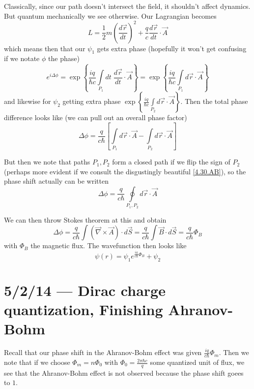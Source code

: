 \documentclass[10pt]{report}
\newcommand{\rd}[2]{\frac{d#1}{d#2}}
\begin{document}
Classically, since our path doesn't intersect the field, it shouldn't affect dynamics. But quantum mechanically we see otherwise. Our Lagrangian becomes
\begin{equation}
    L = \frac{1}{2}m\left( \rd{\vec{r}}{t} \right)^2 + \frac{q}{c}\rd{\vec{r}}{t}\cdot \vec{A}
\end{equation}
which means then that our $\psi_1$ gets extra phase (hopefully it won't get confusing if we notate $\phi$ the phase)
\begin{equation}
    e^{i\Delta \phi} = \exp\left\{ \frac{iq}{\hbar c}\int\limits_{P_1} dt\; \rd{\vec{r}}{t}\cdot \vec{A} \right\} = \exp\left\{ \frac{iq}{\hbar c} \int\limits_{P_1}^{}d\vec{r}\cdot \vec{A} \right\}
\end{equation}
and likewise for $\psi_2$ getting extra phase $\exp\left\{ \frac{iq}{\hbar c}\int\limits_{P_2}^{}d\vec{r} \cdot \vec{A} \right\}$. Then the total phase difference looks like (we can pull out an overall phase factor)
\begin{equation}
    \Delta \phi = \frac{q}{c\hbar}\left[ \int\limits_{P_1}^{}d\vec{r} \cdot \vec{A} - \int\limits_{P_2}^{}d\vec{r} \cdot \vec{A} \right]
\end{equation}

But then we note that paths $P_1, P_2$ form a closed path if we flip the sign of $P_2$ (perhaps more evident if we consult the disgustingly beautiful \ref{4.30.AB}), so the phase shift actually can be written
\begin{equation}
    \Delta \phi = \frac{q}{c\hbar} \oint\limits_{P_1, P_2} d\vec{r} \cdot \vec{A}
\end{equation}

We can then throw Stokes theorem at this and obtain
\begin{equation}
    \Delta \phi = \frac{q}{c\hbar}\int \left( \vec{\nabla} \times \vec{A} \right)\cdot d\vec{S} = \frac{q}{c\hbar}\int \vec{B} \cdot d\vec{S} = \frac{q}{c\hbar} \Phi_B
\end{equation}
with $\Phi_B$ the magnetic flux. The wavefunction then looks like
\begin{equation}
    \psi(r) = \psi_1e^{\frac{iq}{c\hbar}\Phi_B} + \psi_2
\end{equation}
\chapter{5/2/14 --- Dirac charge quantization, Finishing Ahranov-Bohm}

Recall that our phase shift in the Ahranov-Bohm effect was given $\frac{iq}{c\hbar}\Phi_m$. Then we note that if we choose $\Phi_m = n\Phi_0$ with $\Phi_0 = \frac{2\pi \hbar c}{q}$ some quantized unit of flux, we see that the Ahranov-Bohm effect is not observed because the phase shift goees to $1$.
\end{document}
